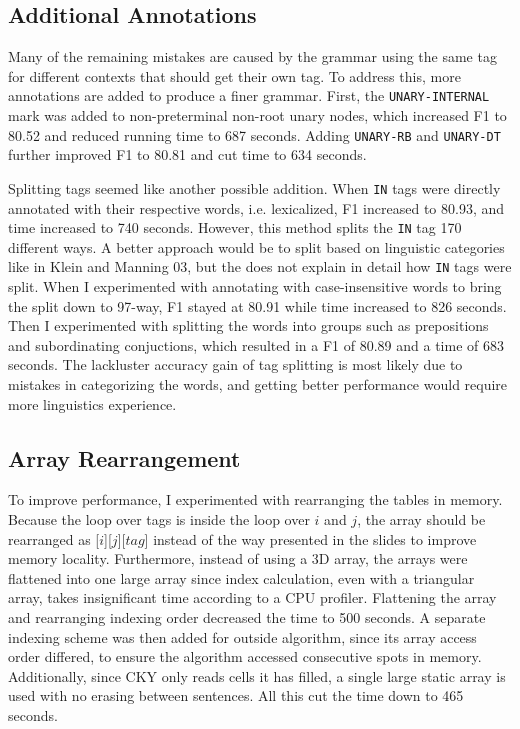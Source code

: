 \documentclass[11pt]{article}
\begin{document}
\subsection{Additional Annotations}
Many of the remaining mistakes are caused by the grammar using the same tag for different contexts
that should get their own tag. To address this, more annotations are added to produce a finer grammar.
First, the \texttt{UNARY-INTERNAL} mark was added to non-preterminal non-root unary nodes,
which increased F1 to 80.52 and reduced running time to 687 seconds. Adding \texttt{UNARY-RB} and
\texttt{UNARY-DT} further improved F1 to 80.81 and cut time to 634 seconds.

Splitting tags seemed like another possible addition. When \texttt{IN} tags were directly
annotated with their respective words, i.e. lexicalized, F1 increased to 80.93, and time increased to
740 seconds. However, this method splits the \texttt{IN} tag 170 different ways. A better approach
would be to split based on linguistic categories like in Klein and Manning 03,
but the does not explain in detail how \texttt{IN} tags were split. When I experimented with
annotating with case-insensitive words to bring the split down to 97-way, F1 stayed at 80.91
while time increased to 826 seconds. Then I experimented with splitting the words into groups
such as prepositions and subordinating conjuctions, which resulted in a F1 of 80.89 and a time of
683 seconds. The lackluster accuracy gain of tag splitting is most likely due to mistakes in
categorizing the words, and getting better performance would require more linguistics experience.

\subsection{Array Rearrangement}
To improve performance, I experimented with rearranging the tables in memory. Because the loop over
tags is inside the loop over $i$ and $j$, the array should be rearranged as [$i$][$j$][$tag$] instead
of the way presented in the slides to improve memory locality. Furthermore, instead of using a
3D array, the arrays were flattened into one large array since index calculation,
even with a triangular array, takes insignificant time according to a CPU profiler. Flattening the
array and rearranging indexing order decreased the time to 500 seconds. A separate indexing scheme
was then added for outside algorithm, since its array access order differed, to ensure the algorithm
accessed consecutive spots in memory. Additionally, since CKY only reads cells it has filled,
a single large static array is used with no erasing between sentences. All this cut the time down
to 465 seconds.
\end{document}
